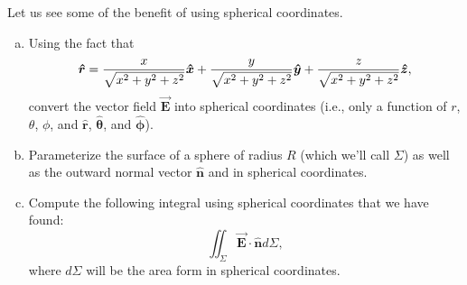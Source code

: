 \documentclass[12pt]{article} %
\newcommand{\vecfieldE}{\boldsymbol{\vec{E}}}
\newcommand{\rhat}{\boldsymbol{\hat{r}}}
\newcommand{\thetahat}{\boldsymbol{\hat{\theta}}}
\newcommand{\phihat}{\boldsymbol{\hat{\phi}}}
\newcommand{\unitvec}{\boldsymbol{\hat{n}}}
\begin{document}
\newpage
\begin{problem}
    Let us see some of the benefit of using spherical coordinates. 
    \begin{enumerate}[(a)]
        \item Using the fact that 
        \[
        \rhat = \frac{x}{\sqrt{x^2+y^2+z^2}}\xhat + \frac{y}{\sqrt{x^2+y^2+z^2}}\yhat + \frac{z}{\sqrt{x^2+y^2+z^2}}\zhat,
        \]
        convert the vector field $\vecfieldE$ into spherical coordinates (i.e., only a function of $r$, $\theta$, $\phi$, and $\rhat$, $\thetahat$, and $\phihat$).
        \item Parameterize the surface of a sphere of radius $R$ (which we'll call $\Sigma$) as well as the outward normal vector $\unitvec$ and  in spherical coordinates.
        \item Compute the following integral using spherical coordinates that we have found:
        \[
        \iint_\Sigma \vecfieldE \cdot \unitvec d\Sigma,
        \]
        where $d\Sigma$ will be the area form in spherical coordinates.
    \end{enumerate}
\end{problem}
\end{document}
